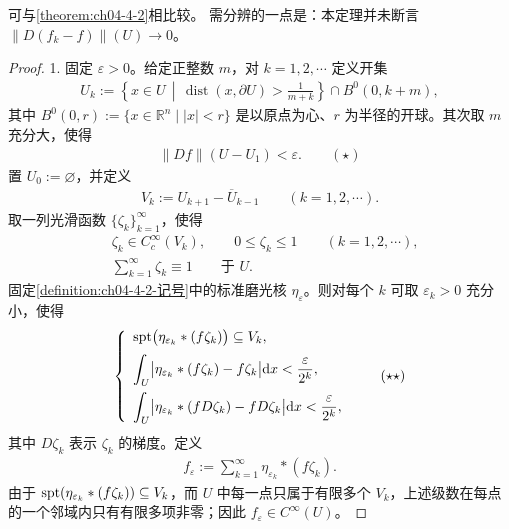 \documentclass[../../main.tex]{subfiles}%
\begin{document}
\begin{remark}\label{remark:ch05-thm-5-3-比较}
可与\cref{theorem:ch04-4-2}相比较。%
需分辨的一点是：本定理并未断言 $\lVert D(f_k-f)\rVert(U)\to0$。
\end{remark}

\begin{proof}
1. 固定 $\varepsilon>0$。给定正整数 $m$，对 $k=1,2,\cdots$ 定义开集
\begin{align*}
U_k:=\left\{x\in U\,\middle|\,\operatorname{dist}(x,\partial U)>\frac{1}{m+k}\right\}\cap B^0(0,k+m),
\end{align*}
其中 $B^0(0,r):=\{x\in\mathbb{R}^n\mid\lvert x\rvert<r\}$ 是以原点为心、$r$ 为半径的开球。其次取 $m$ 充分大，使得
\begin{align*}
\lVert Df\rVert(U-U_1)<\varepsilon .\qquad(\star)
\end{align*}
置 $U_0:=\varnothing$，并定义
\begin{align*}
V_k:=U_{k+1}-\overline{U}_{k-1}\qquad(k=1,2,\cdots).
\end{align*}
取一列光滑函数 $\{\zeta_k\}_{k=1}^{\infty}$，使得
\begin{align*}
&\zeta_k\in C_c^{\infty}(V_k),\qquad0\leqslant\zeta_k\leqslant1\qquad(k=1,2,\cdots),\\
&\sum_{k=1}^{\infty}\zeta_k\equiv1\qquad\text{于 }U .
\end{align*}
固定\cref{definition:ch04-4-2-记号}中的标准磨光核 $\eta_\varepsilon$。则对每个 $k$ 可取 $\varepsilon_k>0$ 充分小，使得%
\begin{align*}
\left\{
\begin{array}{l}
\displaystyle\operatorname{spt}\bigl(\eta_{\varepsilon_k}*(f\zeta_k)\bigr)\subseteq V_k,\\[6pt]
\displaystyle\int_U\bigl\lvert\eta_{\varepsilon_k}*(f\zeta_k)-f\zeta_k\bigr\rvert\mathrm{d} x<\frac{\varepsilon}{2^{k}},\\[10pt]
\displaystyle\int_U\bigl\lvert\eta_{\varepsilon_k}*(fD\zeta_k)-fD\zeta_k\bigr\rvert\mathrm{d} x<\frac{\varepsilon}{2^{k}},
\end{array}
\right.\qquad(\star\star)
\end{align*}
其中 $D\zeta_k$ 表示 $\zeta_k$ 的梯度。定义
\begin{align*}
f_\varepsilon:=\sum_{k=1}^{\infty}\eta_{\varepsilon_k}*(f\zeta_k).
\end{align*}
由于 $\operatorname{spt}(\eta_{\varepsilon_k}*(f\zeta_k))\subseteq V_k$，而 $U$ 中每一点只属于有限多个 $V_k$，上述级数在每点的一个邻域内只有有限多项非零；因此 $f_\varepsilon\in C^{\infty}(U)$。


\end{proof}
\end{document}
